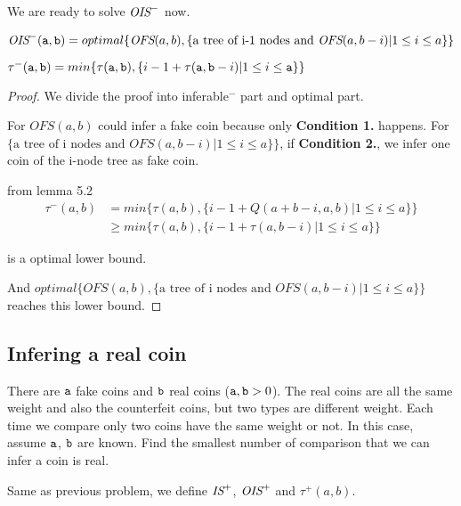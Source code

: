 We are ready to solve $\text{\it OIS}^-$ now.

\begin{theorem}
$\text{\it OIS}^-(\mathtt{a},\mathtt{b})=optimal\{\text{\it OFS}(a,b), \{\text{a tree of i-1 nodes and }\text{\it OFS}(a,b-i) |1\leq i\leq a\}\}$

$\tau^-(\mathtt{a},\mathtt{b})=min\{\tau(\mathtt{a},\mathtt{b}), \{i-1+\tau(\mathtt{a},\mathtt{b}-i) | 1\leq i\leq\mathtt{a}\} \}$
\end{theorem}

\begin{proof}
We divide the proof into inferable$^-$ part and optimal part.


For $OFS(a,b)$ could infer a fake coin because only \textbf{Condition 1.} happens.
For $\{\text{a tree of i nodes and }OFS(a,b-i) |1\leq i\leq a\}\}$, if \textbf{Condition 2.}, we infer one coin of the i-node tree as fake coin.

from lemma 5.2
\begin{align*}
\tau^-(a,b)&=min\{\tau(a,b),\{i-1+Q(a+b-i,a,b) | 1\leq i\leq a\} \}\\
&\geq min\{\tau(a,b), \{i-1+\tau(a,b-i) | 1\leq i\leq a\} \}
\end{align*}

is a optimal lower bound.

And $optimal\{OFS(a,b), \{\text{a tree of i nodes and }OFS(a,b-i) |1\leq i\leq a\}\}$ reaches this lower bound.

\end{proof}

\subsection*{Infering a real coin}

{
\setlength{\leftskip}{1cm}
\setlength{\rightskip}{1cm}
\noindent 
There are $\mathtt{a}$ fake coins and $\mathtt{b}$ real coins ($\mathtt{a}, \mathtt{b} > 0$). The real coins are all the same weight and also the counterfeit coins, but two  types are different weight. Each time we compare only two coins have the same weight or not. In this case, assume $\mathtt{a}$, $\mathtt{b}$ are known.
Find the smallest number of comparison that we can infer a coin is real.\\

}

\begin{definition}
Same as previous problem, we define $\text{\it IS}^+$, $\text{\it OIS}^+$ and $\tau^+(a,b)$.
\end{definition}

